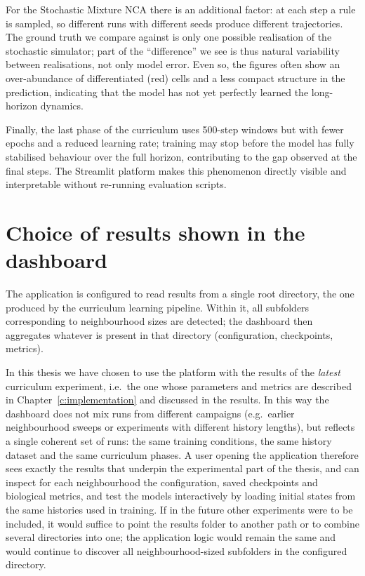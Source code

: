 For the Stochastic Mixture NCA there is an additional factor: at each step a rule is sampled, so different runs with different seeds produce different trajectories.
The ground truth we compare against is only one possible realisation of the stochastic simulator; part of the ``difference'' we see is thus natural variability between realisations, not only model error.
Even so, the figures often show an over-abundance of differentiated (red) cells and a less compact structure in the prediction, indicating that the model has not yet perfectly learned the long-horizon dynamics.

Finally, the last phase of the curriculum uses 500-step windows but with fewer epochs and a reduced learning rate; training may stop before the model has fully stabilised behaviour over the full horizon, contributing to the gap observed at the final steps.
The Streamlit platform makes this phenomenon directly visible and interpretable without re-running evaluation scripts.

\section{Choice of results shown in the dashboard}

The application is configured to read results from a single root directory, the one produced by the curriculum learning pipeline.
Within it, all subfolders corresponding to neighbourhood sizes are detected; the dashboard then aggregates whatever is present in that directory (configuration, checkpoints, metrics).

In this thesis we have chosen to use the platform with the results of the \emph{latest} curriculum experiment, i.e.\ the one whose parameters and metrics are described in Chapter~\ref{c:implementation} and discussed in the results.
In this way the dashboard does not mix runs from different campaigns (e.g.\ earlier neighbourhood sweeps or experiments with different history lengths), but reflects a single coherent set of runs: the same training conditions, the same history dataset and the same curriculum phases.
A user opening the application therefore sees exactly the results that underpin the experimental part of the thesis, and can inspect for each neighbourhood the configuration, saved checkpoints and biological metrics, and test the models interactively by loading initial states from the same histories used in training.
If in the future other experiments were to be included, it would suffice to point the results folder to another path or to combine several directories into one; the application logic would remain the same and would continue to discover all neighbourhood-sized subfolders in the configured directory.
